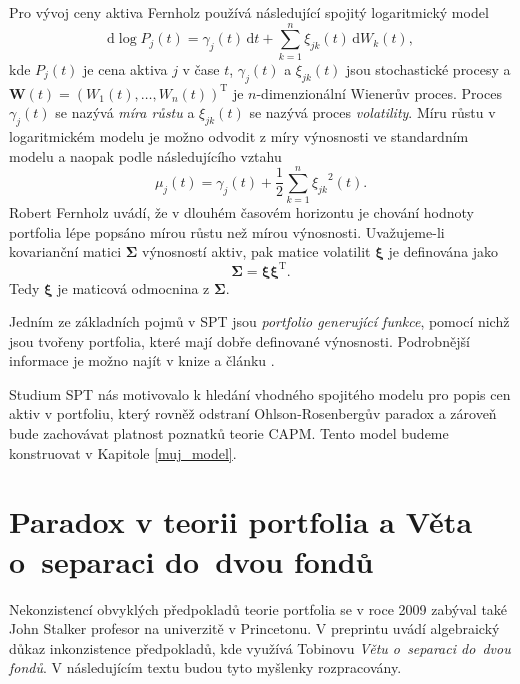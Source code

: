 \documentclass[a4paper,12pt]{report}
\theoremstyle{definition} \newtheorem{definice}[veta]{Definice}
\theoremstyle{remark}
\begin{document}
Pro vývoj ceny aktiva Fernholz používá následující spojitý logaritmický model
$$\mathrm{d}\log P_j(t)=\gamma_j(t)\,\mathrm{d}t+\sum_{k=1}^{n}\xi_{jk}(t)\,\mathrm{d}W_k(t),$$
kde $P_j(t)$ je cena aktiva $j$ v čase $t$, $\gamma_j(t)$ a $\xi_{jk}(t)$ jsou stochastické procesy a $\boldsymbol{W}(t)=(W_1(t),\dots,W_n(t))^\mathrm{T}$ je $n$-dimenzionální Wienerův proces. 
Proces $\gamma_j(t)$ se nazývá \textit{míra růstu} a $\xi_{jk}(t)$ se nazývá proces \textit{volatility}.
Míru růstu v logaritmickém modelu je možno odvodit z míry výnosnosti ve standardním modelu a naopak podle následujícího vztahu
$$\mu_j(t)=\gamma_j(t)+\frac12\sum_{k=1}^{n}{\xi_{jk}}^2(t).$$
Robert Fernholz uvádí, že v dlouhém časovém horizontu je chování hodnoty portfolia lépe popsáno mírou růstu než mírou výnosnosti.
Uvažujeme-li kovarianční matici $\boldsymbol{\Sigma}$ výnosností aktiv, pak matice volatilit $\boldsymbol{\xi}$ je definována jako
$$\boldsymbol{\Sigma}=\boldsymbol{\xi}\boldsymbol{\xi}^\mathrm{T}.$$
Tedy $\boldsymbol{\xi}$ je maticová odmocnina z $\boldsymbol{\Sigma}$.

Jedním ze základních pojmů v SPT jsou \textit{portfolio generující funkce}, pomocí nichž jsou tvořeny portfolia, které mají dobře definované výnosnosti. 
Podrobnější informace je možno najít v knize \cite{fern} a článku \cite{kara}.

Studium SPT nás motivovalo k hledání vhodného spojitého modelu pro popis cen aktiv v portfoliu, který rovněž odstraní Ohlson-Rosenbergův paradox a zároveň bude zachovávat platnost poznatků teorie CAPM.
Tento model budeme konstruovat v Kapitole \ref{muj_model}.




\section{Paradox v teorii portfolia a Věta o~separaci do~dvou fondů} \label{john}
Nekonzistencí obvyklých předpokladů teorie portfolia se v roce 2009 zabýval také John Stalker profesor na univerzitě v Princetonu. 
V preprintu \cite{john} uvádí algebraický důkaz inkonzistence předpokladů, kde využívá Tobinovu \textit{Větu o~separaci do~dvou fondů}. 
V následujícím textu budou tyto myšlenky rozpracovány.
\end{document}
